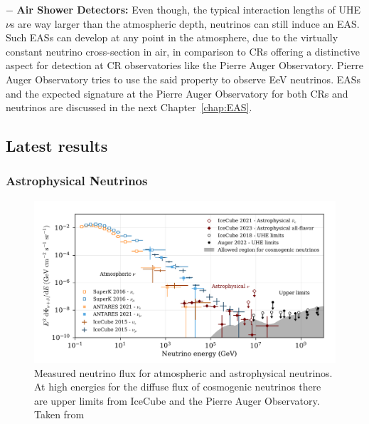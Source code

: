 \begin{description}
  \item $-$ \textbf{Air Shower Detectors:} Even though, the typical interaction lengths of UHE$\nu$s are way larger than the atmospheric depth, neutrinos can still induce an EAS. Such EASs can develop at any point in the atmosphere, due to the virtually constant neutrino cross-section in air, in comparison to \glspl{CR} offering a distinctive aspect for detection at \gls{CR} observatories like the Pierre Auger Observatory. Pierre Auger Observatory tries to use the said property to observe EeV neutrinos. EASs and the expected signature at the Pierre Auger Observatory for both \glspl{CR} and neutrinos are discussed in the next Chapter~\ref{chap:EAS}.   

  \end{description}

\subsection{Latest results}
  \label{subsec:Nuresults}
  
\subsubsection*{Astrophysical Neutrinos}

\begin{figure}[t!]
  \centering
  \includegraphics[width=14.5cm]{thesis_figures/CRnNu/Nu_flux_measurement.png}
  \caption{Measured neutrino flux for atmospheric and astrophysical neutrinos. At high energies for the diffuse flux of cosmogenic neutrinos there are upper limits from IceCube and the Pierre Auger Observatory. Taken from~\cite{ParticleDataGroup:2024cfk}}
  \label{fig:Nu_flux_measurement}
\end{figure}

